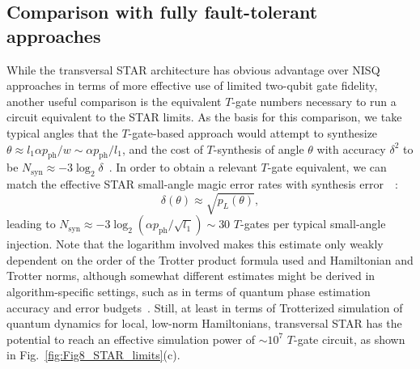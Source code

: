 \documentclass[aps, prx, reprint, superscriptaddress, longbibliography, floatfix]{revtex4-2}
\begin{document}
\subsection{Comparison with fully fault-tolerant approaches}
\label{sec:comparison_T}

 While the transversal STAR architecture has obvious advantage over NISQ approaches in terms of more effective use of limited two-qubit gate fidelity, another useful comparison is the equivalent $T$-gate numbers necessary to run a circuit equivalent to the STAR limits. As the basis for this comparison, we take typical angles that the $T$-gate-based approach would attempt to synthesize $\theta \approx l_1\alpha p_{\mathrm{ph}}/w \sim \alpha p_{\mathrm{ph}}/l_1$, and the cost of $T$-synthesis of angle $\theta$ with accuracy $\delta^2$ to be $N_{\mathrm{syn}}\approx - 3\log_2{\delta}$~\cite{Ross2016}. In order to obtain a relevant $T$-gate equivalent, we can match the effective STAR small-angle magic error rates with synthesis error~~\cite{Yin2025}: 
 \begin{equation}
 \delta(\theta)\approx \sqrt{p_L(\theta)},
 \end{equation}
 leading to $N_{\mathrm{syn}} \approx -3\log_2{(\alpha p_{\mathrm{ph}}/\sqrt{l_1})}\sim 30$ $T$-gates per typical small-angle injection. Note that the logarithm involved makes this estimate only weakly dependent on the order of the Trotter product formula used and Hamiltonian and Trotter norms, although somewhat different estimates might be derived in algorithm-specific settings, such as in terms of quantum phase estimation accuracy and error budgets~\cite{Bocharov2015, Kivlichan2018}. Still, at least in terms of Trotterized simulation of quantum dynamics for local, low-norm Hamiltonians, transversal STAR has the potential to reach an effective simulation power of $\sim 10^7$ $ T$-gate circuit, as shown in Fig.~\ref{fig:Fig8_STAR_limits}(c).
 
\end{document}
